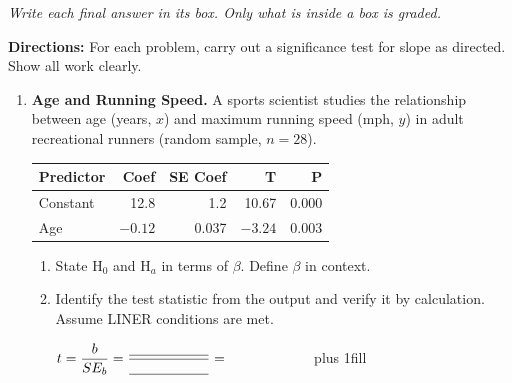 \documentclass[10pt]{article}
\begin{document}
{\small\itshape Write each final answer in its box. Only what is inside a box is graded.}\par

\vspace{0.1in}
\textbf{Directions:} For each problem, carry out a significance test for slope as directed.
Show all work clearly.

\begin{enumerate}

  \boxguard[15]
  \item \textbf{Age and Running Speed.} A sports scientist studies the relationship between
        age (years, $x$) and maximum running speed (mph, $y$) in adult recreational runners
        (random sample, $n = 28$).

        \begin{center}
        \renewcommand{\arraystretch}{1.4}
        \begin{tabular}{lrrrr}
            \textbf{Predictor} & \textbf{Coef} & \textbf{SE Coef} & \textbf{T} & \textbf{P} \\
            \hline
            Constant & 12.8 & 1.2   & 10.67 & 0.000 \\
            Age      & $-0.12$ & 0.037 & $-3.24$ & 0.003 \\
        \end{tabular}
        \end{center}

        \begin{enumerate}[label=\alph*.]
          \boxguard[15]
          \item State H$_0$ and H$_a$ in terms of $\beta$. Define $\beta$ in context.


          \boxguard[15]
          \item Identify the test statistic from the output and verify it by calculation.
                Assume LINER conditions are met.

                $t = \dfrac{b}{SE_b} = \dfrac{\blank{2cm}}{\blank{2cm}} = \hphantom{\blank{2cm}}$\hskip 0pt plus 1fill


\end{enumerate}
\end{enumerate}
\end{document}
